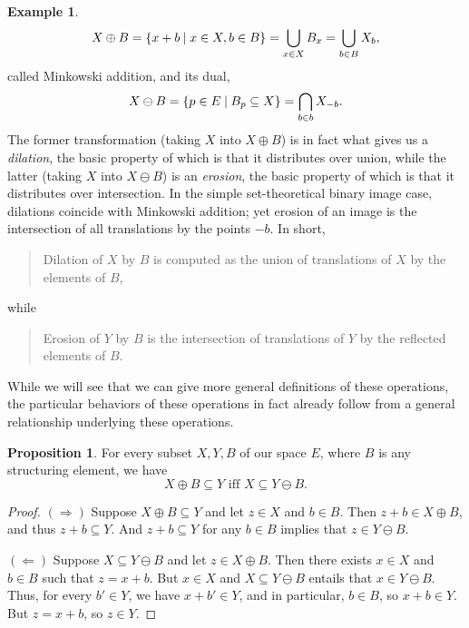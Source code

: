 \documentclass[11pt]{book}
\theoremstyle{definition}
\newtheorem{example}{Example}[section]
\theoremstyle{definition}
\theoremstyle{definition}
\newtheorem{proposition}{Proposition}[section]
\theoremstyle{theorem}
\theoremstyle{definition}
\begin{document}
\begin{example}
\begin{equation}
	X \oplus B = \{x + b \hspace*{0.25em}| \hspace*{0.25em} x \in X, b \in B \} = \bigcup_{x \in X} B_x = \bigcup_{b \in B} X_b,
	\end{equation}
	called Minkowski addition, and its dual, 
	\begin{equation}
	X \ominus B = \{p \in E \hspace*{0.25em}| \hspace*{0.25em} B_p \subseteq  X \} = \bigcap_{b \in b} X_{-b}.
	\end{equation}
	The former transformation (taking $X$ into $X \oplus B$) is in fact what gives us a \textit{dilation},  the basic property of which is that it distributes over union, while the latter (taking $X$ into $X \ominus B$) is an \textit{erosion},  the basic property of which is that it distributes over intersection. In the simple set-theoretical binary image case, dilations coincide with Minkowski addition; yet erosion of an image is the intersection of all translations by the points $-b$. In short,  
	\begin{quote}
		Dilation of $X$ by $B$ is computed as the union of translations of $X$ by the elements of $B$, 
	\end{quote}
while 
\begin{quote}
	Erosion of $Y$ by $B$ is the intersection of translations of $Y$ by the reflected elements of $B$.
\end{quote} \noindent 
While we will see that we can give more general definitions of these operations, the particular behaviors of these operations in fact already follow from a general relationship underlying these operations.
\begin{proposition} 
	For every subset $X, Y, B$ of our space $E$, where $B$ is any structuring element, we have  
	\begin{equation}
	X \oplus B \subseteq  Y \text{ iff } X \subseteq  Y \ominus B. 
	\end{equation}
\end{proposition}
	\begin{proof}
		$(\Rightarrow)$ Suppose $X \oplus B \subseteq  Y$ and let $z \in X$ and $b \in B$. Then $z + b \in X \oplus B$, and thus $z + b \subseteq  Y$. And $z + b \subseteq  Y$ for any $b \in B$ implies that $z \in Y \ominus B$. \par \noindent  
		$(\Leftarrow)$ Suppose $X \subseteq  Y \ominus B$ and let $z \in X \oplus B$. Then there exists $x \in X$ and $b \in B$ such that $z = x + b$. But $x \in X$ and $X \subseteq  Y \ominus B$ entails that $x \in Y \ominus B$. Thus, for every $b' \in Y$, we have $x + b' \in Y$, and in particular, $b \in B$, so $x + b \in Y$. But $z = x + b$, so $z \in Y$. 

\end{proof}
\end{example}
\end{document}
